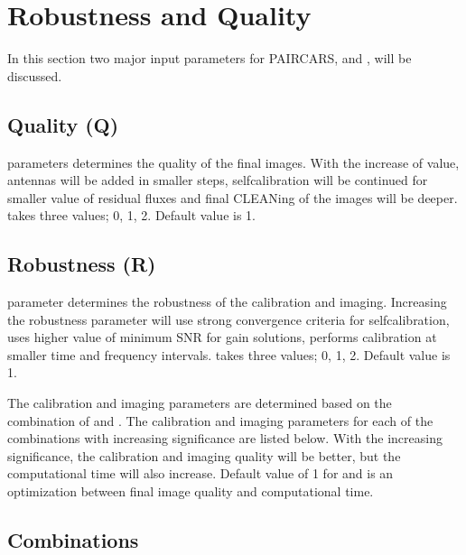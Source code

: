\documentclass[letterpaper,10pt,english]{sphinxmanual}
\begin{document}
\chapter{Robustness and Quality}
\label{\detokenize{robust_quality:robustness-and-quality}}\label{\detokenize{robust_quality::doc}}
\sphinxAtStartPar
In this section two major input parameters for P\sphinxhyphen{}AIRCARS,  and , will be discussed.


\section{Quality (Q)}
\label{\detokenize{robust_quality:quality-q}}
\sphinxAtStartPar
{} parameters determines the quality of the final images. With the increase of  value, antennas will be added in smaller steps, self\sphinxhyphen{}calibration will be continued for smaller value of residual fluxes and final CLEANing of the images will be deeper.  takes three values; 0, 1, 2. Default value is 1.


\section{Robustness (R)}
\label{\detokenize{robust_quality:robustness-r}}
\sphinxAtStartPar
{} parameter determines the robustness of the calibration and imaging. Increasing the robustness parameter will use strong convergence criteria for self\sphinxhyphen{}calibration, uses higher value of minimum SNR for gain solutions, performs calibration at smaller time and frequency intervals.  takes three values; 0, 1, 2. Default value is 1.

\sphinxAtStartPar
The calibration and imaging parameters are determined based on the combination of  and . The calibration and imaging parameters for each of the combinations with increasing significance are listed below. With the increasing significance, the calibration and imaging quality will be better, but the computational time will also increase. Default value of 1 for  and  is an optimization between final image quality and computational time.


\section{Combinations}
\label{\detokenize{robust_quality:combinations}}
\sphinxAtStartPar
{}
\end{document}
